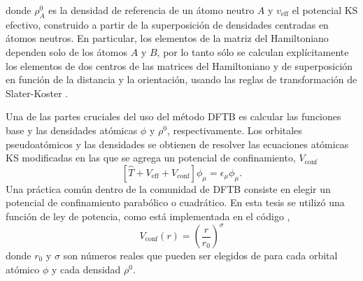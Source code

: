 donde $\rho_A^0$ es la densidad de referencia de un átomo neutro $A$ y 
$v_{\text{eff}}$ el potencial KS efectivo, construido a partir de la superposición
de densidades centradas en átomos neutros. En particular, los elementos de la 
matriz del Hamiltoniano dependen solo de los átomos $A$ y $B$, por lo tanto sólo
se calculan explícitamente los elementos de dos centros de las matrices del 
Hamiltoniano y de superposición en función de la distancia y la orientación, usando 
las reglas de transformación de Slater-Koster \cite{slater1954}.

Una de las partes cruciales del uso del método DFTB es calcular las funciones 
base y las densidades atómicas $\phi$ y $\rho^0$, respectivamente. Los orbitales
pseudoatómicos y las densidades se obtienen de resolver las ecuaciones atómicas KS 
modificadas en las que se agrega un potencial de confinamiento, $V_{\text{conf}}$
\begin{equation}\label{eq:dft}
    \left[\hat{T}+V_{\text{eff}}+V_{\text{conf}}\right]\phi_\mu=\epsilon_\mu\phi_\mu.
\end{equation}
Una práctica común dentro de la comunidad de DFTB consiste en elegir un potencial
de confinamiento parabólico o cuadrático. En esta tesis se utilizó una función 
de ley de potencia, como está implementada en el código 
\cite{hotcent},
\begin{equation}\label{eq:vconf}
    V_{\text{conf}}(r)=\left(\frac{r}{r_0}\right)^{\sigma}
\end{equation}
donde $r_0$ y $\sigma$ son números reales que pueden ser elegidos de para cada 
orbital atómico $\phi$ y cada densidad $\rho^0$.

